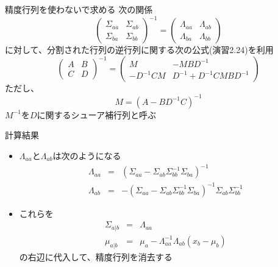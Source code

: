 \begin{frame}{精度行列を使わないで求める}
 次の関係
 \begin{equation}
  \begin{pmatrix}
   \Sigma_{aa} & \Sigma_{ab}  \\
   \Sigma_{ba} & \Sigma_{bb}
  \end{pmatrix}^{-1}=
  \begin{pmatrix}
   \Lambda_{aa} & \Lambda_{ab}  \\
   \Lambda_{ba} & \Lambda_{bb}
  \end{pmatrix}
 \end{equation}
 に対して、分割された行列の逆行列に関する次の公式(演習2.24)を利用
 \begin{equation}
  \begin{pmatrix}
   A & B \\
   C & D
  \end{pmatrix}^{-1}
  =
  \begin{pmatrix}
   M & -MBD^{-1} \\
   -D^{-1}CM & D^{-1}+D^{-1}CMBD^{-1}
  \end{pmatrix}
 \end{equation}
 ただし、
 \begin{equation}
  M=(A-BD^{-1}C)^{-1}
 \end{equation}
 $M^{-1}$を$D$に関するシューア補行列と呼ぶ
\end{frame}

\begin{frame}{計算結果}
 \begin{itemize}
  \item $\Lambda_{aa}$と$\Lambda_{ab}$は次のようになる
        \begin{eqnarray}
         \Lambda_{aa}&=&(\Sigma_{aa}-\Sigma_{ab}\Sigma_{bb}^{-1}\Sigma_{ba})^{-1} \\
         \Lambda_{ab}&= &-(\Sigma_{aa}-\Sigma_{ab}\Sigma_{bb}^{-1}\Sigma_{ba})^{-1} \Sigma_{ab}\Sigma_{bb}^{-1}
        \end{eqnarray}
  \item これらを
        \begin{eqnarray}
         \Sigma_{a|b} &=& \Lambda_{aa} \\
         \mu_{a|b}  &= & \mu_a - \Lambda_{aa}^{-1}\Lambda_{ab}(x_b-\mu_b)
        \end{eqnarray}
        の右辺に代入して、精度行列を消去する
 \end{itemize}
\end{frame}

